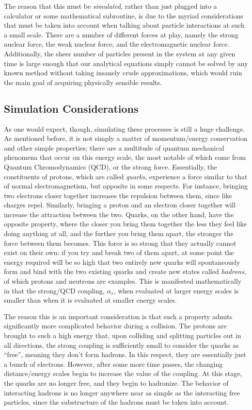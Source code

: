 The reason that this must be \textit{simulated}, rather than just plugged into a calculator or some mathematical subroutine, is due to the myriad considerations that must be taken into account when talking about particle interactions at such a small scale. There are a number of different forces at play, namely the strong nuclear force, the weak nuclear force, and the electromagnetic nuclear force. Additionally, the sheer number of particles present in the system at any given time is large enough that our analytical equations simply cannot be solved by any known method without taking insanely crude approximations, which would ruin the main goal of acquiring physically sensible results.


\subsection{Simulation Considerations}\label{sec:Sim-Considerations}

As one would expect, though, simulating these processes is still a huge challenge. As mentioned before, it is not simply a matter of momentum/energy conservation and other simple properties; there are a multitude of quantum mechanical phenomena that occur on this energy scale, the most notable of which come from Quantum Chromodynamics (QCD), or the strong force. Essentially, the constituents of protons, which are called \textit{quarks}, experience a force similar to that of normal electromagnetism, but opposite in some respects. For instance, bringing two electrons closer together increases the repulsion between them, since like charges repel. Similarly, bringing a proton and an electron closer together will increase the attraction between the two. Quarks, on the other hand, have the opposite property, where the closer you bring them together the less they feel like doing anything at all, and the further you bring them apart, the stronger the force between them becomes. This force is so strong that they actually cannot exist on their own: if you try and break two of them apart, at some point the energy required will be so high that two entirely new quarks will spontaneously form and bind with the two existing quarks and create new states called \textit{hadrons}, of which protons and neutrons are examples. This is manifested mathematically in that the strong/QCD coupling, $\alpha_s$, when evaluated at larger energy scales is smaller than when it is evaluated at smaller energy scales.

The reason this is an important consideration is that such a property admits significantly more complicated behavior during a collision. The protons are brought to such a high energy that, upon colliding and splitting particles out in all directions, the strong coupling is sufficiently small to consider the quarks as ``free'', meaning they don't form hadrons. In this respect, they are essentially just a bunch of electrons. However, after some more time passes, the changing distance/energy scales begin to increase the value of the coupling. At this stage, the quarks are no longer free, and they begin to hadronize. The behavior of interacting hadrons is no longer anywhere near as simple as the interacting free particles, since the substructure of the hadrons must be taken into account. 

